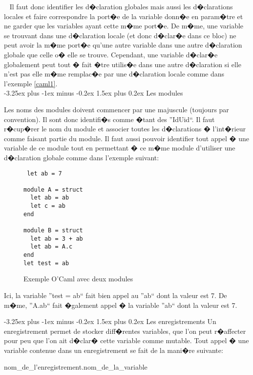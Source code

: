 \documentclass[a4paper,11pt,titlepage]{article}
\makeatletter
\renewcommand{\paragraph}{\@startsection{paragraph}{4}{0ex}%
   {-3.25ex plus -1ex minus -0.2ex}%
   {1.5ex plus 0.2ex}%
   {\normalfont\normalsize\bfseries}}
\makeatother
\begin{document}
~\newline
Il faut donc identifier les d�claration globales mais aussi les d�clarations locales et faire correspondre la port�e de la variable donn�e en param�tre et ne garder que les variables ayant cette m�me port�e. De m�me, une variable se trouvant dans une d�claration locale (et donc d�clar�e dans ce bloc) ne peut avoir la m�me port�e qu'une autre variable dans une autre d�claration globale que celle o� elle se trouve. Cependant, une variable d�clar�e globalement peut tout � fait �tre utilis�e dans une autre d�claration si elle n'est pas elle m�me remplac�e par une d�claration locale comme dans l'exemple \ref{caml1}.\\


\paragraph{Les modules}

Les noms des modules doivent commencer par une majuscule (toujours par convention). Il sont donc identifi�s comme �tant des ''IdUid``. Il faut r�cup�rer le nom du module et associer toutes les d�clarations � l'int�rieur comme faisant partie du module. Il faut aussi pouvoir identifier tout appel � une variable de ce module tout en permettant � ce m�me module d'utiliser une d�claration globale comme dans l'exemple suivant:

\begin{figure}[H]
 \begin{lstlisting}
 let ab = 7

module A = struct
  let ab = ab
  let c = ab
end

module B = struct
  let ab = 3 + ab
  let ab = A.c
end
let test = ab
 \end{lstlisting}
 \caption{Exemple O'Caml avec deux modules}
 \label{caml3}
\end{figure}


Ici, la variable ''test = ab`` fait bien appel au ''ab`` dont la valeur est 7. De m�me, ''A.ab`` fait �galement appel � la variable ''ab`` dont la valeur est 7.


\paragraph{Les enregistrements}
Un enregistrement permet de stocker diff�rentes variables, que l'on peut r�affecter pour peu que l'on ait d�clar� cette variable comme mutable. Tout appel � une variable contenue dans un enregistrement se fait de la mani�re suivante:
\begin{center}
 nom\_de\_l'enregistrement.nom\_de\_la\_variable
\end{center}
\end{document}
